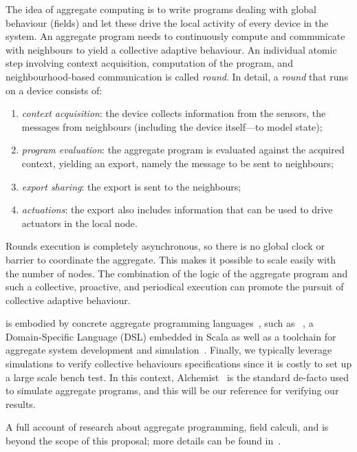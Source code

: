 \documentclass[11pt]{article}
\begin{document}
The idea of aggregate computing is to write programs dealing with global behaviour (fields) and let these drive the local activity of every device in the system.
%
An aggregate program needs to continuously compute and communicate with neighbours to yield a collective adaptive behaviour.
%
An individual atomic step involving context acquisition, computation of the program, and neighbourhood-based communication is called \emph{round}.
%
In detail, a \emph{round} that runs on a device consists of:
\begin{enumerate}
  \item \emph{context acquisition}: the device collects information from the sensors, the messages from neighbours (including the device itself---to model state);
  \item \emph{program evaluation}: the aggregate program is evaluated against the acquired context, yielding an export, namely the message to be sent to neighbours;
  \item \emph{export sharing}: the export is sent to the neighbours;
  \item \emph{actuations}: the export also includes information that can be used to drive actuators in the local node.
\end{enumerate}

Rounds execution is completely asynchronous, so there is no global clock or barrier to coordinate the aggregate. This makes it possible to scale easily with the number of nodes. 
%
The combination of the logic of the aggregate program and such a collective, proactive, and periodical execution can promote the pursuit of collective adaptive behaviour.

\ac{} is embodied by concrete aggregate programming languages~\cite{viroli2019jlamp-si-coord},
 such as \scafi{}~\cite{DBLP:conf/isola/CasadeiVAD20,DBLP:journals/eaai/CasadeiVAPD21},
 a Domain-Specific Language (DSL) embedded in Scala
 as well as a toolchain for aggregate system development and simulation~\cite{Casadei2016mass}.
%
Finally, we typically leverage simulations to verify collective behaviours specifications since it is costly to set up a large scale bench test. In this context, Alchemist~\cite{Pianini_2013} is the standard de-facto used to simulate aggregate programs, and this will be our reference for verifying our results.

A full account of research about aggregate programming, field calculi, and \scafi{} is beyond the scope of this proposal; more details can be found in~\cite{viroli2019jlamp-si-coord,DBLP:journals/eaai/CasadeiVAPD21}.
\end{document}
